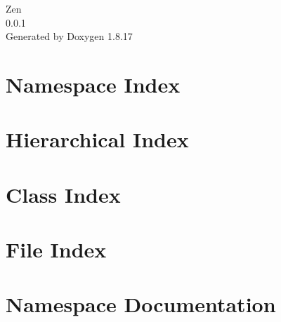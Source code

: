 \let\mypdfximage\pdfximage\def\pdfximage{\immediate\mypdfximage}\documentclass[twoside]{book}
\newcommand{\+}{\discretionary{\mbox{\scriptsize$\hookleftarrow$}}{}{}}
\newcommand{\clearemptydoublepage}{%
  \newpage{\pagestyle{empty}\cleardoublepage}%
}
\begin{document}
\hypersetup{pageanchor=false,
             bookmarksnumbered=true,
             pdfencoding=unicode
            }
\begin{titlepage}
\vspace*{7cm}
\begin{center}%
{\Large Zen \\[1ex]\large 0.\+0.\+1 }\\
\vspace*{1cm}
{\large Generated by Doxygen 1.8.17}\\
\end{center}
\end{titlepage}
\clearemptydoublepage
{}
\tableofcontents
\clearemptydoublepage
{}
\hypersetup{pageanchor=true}

\chapter{Namespace Index}

\chapter{Hierarchical Index}

\chapter{Class Index}

\chapter{File Index}

\chapter{Namespace Documentation}



\end{document}
